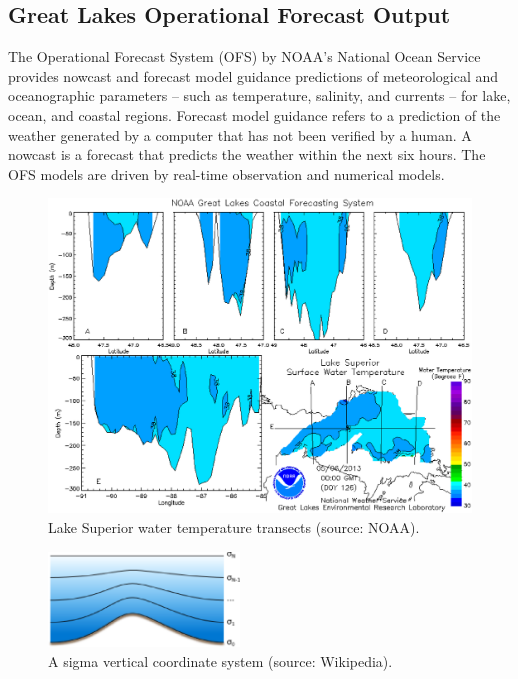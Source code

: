 \documentclass{article} %
\begin{document}
\subsection{Great Lakes Operational Forecast Output}

The Operational Forecast System (OFS) by NOAA's National Ocean Service provides nowcast and forecast model guidance predictions of meteorological and oceanographic parameters -- such as temperature, salinity, and currents -- for lake, ocean, and coastal regions.  Forecast model guidance refers to a prediction of the weather generated by a computer that has not been verified by a human.  A nowcast is a forecast that predicts the weather within the next six hours.  The OFS models are driven by real-time observation and numerical models.

\begin{figure}[htb]
   \centering
   \includegraphics[width=5in]{figures/noaa.eps}
   \caption{Lake Superior water temperature transects (source: NOAA).}
   \label{fig:noaa}
\end{figure}

\begin{figure}
   \centering
   \includegraphics[width=2in]{figures/sigma.eps}
    \caption{A sigma vertical coordinate system (source: Wikipedia).}
   \label{fig:sigma}
\end{figure}
\end{document}
